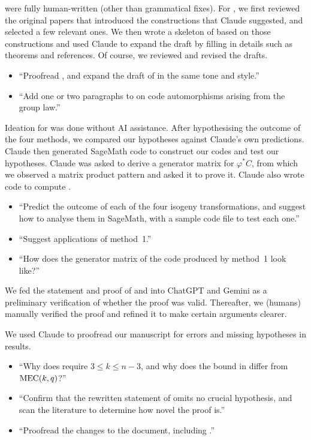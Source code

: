 \documentclass[twocolumn, 11pt]{scrartcl}
\begin{document}
 were fully human-written (other than grammatical fixes). For , we first reviewed the original papers that introduced the constructions that Claude suggested, and selected a few relevant ones. We then wrote a skeleton of  based on those constructions and used Claude to expand the draft by filling in details such as theorems and references. Of course, we reviewed and revised the drafts.
\begin{itemize}
    \item ``Proofread , and expand the draft of  in the same tone and style.''
    \item ``Add one or two paragraphs to  on code automorphisms arising from the group law.''
\end{itemize}

Ideation for  was done without AI assistance. After hypothesising the outcome of the four methods, we compared our hypotheses against Claude's own predictions. Claude then generated SageMath code to construct our codes and test our hypotheses. Claude was asked to derive a generator matrix for $\varphi^*C$, from which we observed a matrix product pattern and asked it to prove it. Claude also wrote code to compute .
\begin{itemize}
    \item ``Predict the outcome of each of the four isogeny transformations, and suggest how to analyse them in SageMath, with a sample code file to test each one.''
    \item ``Suggest applications of method~1.''
    \item ``How does the generator matrix of the code produced by method~1 look like?''
\end{itemize}

We fed the statement and proof of  and  into ChatGPT and Gemini as a preliminary verification of whether the proof was valid. Thereafter, we (humans) manually verified the proof and refined it to make certain arguments clearer.

We used Claude to proofread our manuscript for errors and missing hypotheses in results.
\begin{itemize}
    \item ``Why does  require $3\leq k\leq n-3$, and why does the bound in \cite{zhu2026isodual} differ from $\operatorname{MEC}(k,q)$?''
    \item ``Confirm that the rewritten statement of  omits no crucial hypothesis, and scan the literature to determine how novel the proof is.''
    \item ``Proofread the changes to the document, including .''
\end{itemize}
\end{document}

